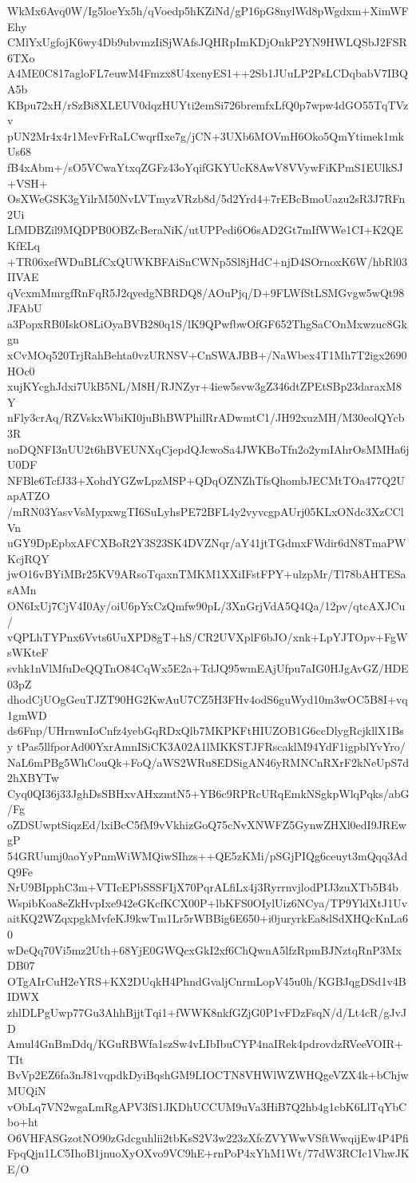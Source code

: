 WkMx6Avq0W/Ig5loeYx5h/qVoedp5hKZiNd/gP16pG8nylWd8pWgdxm+XimWFEhy
CMlYxUgfojK6wy4Db9ubvmzIiSjWAfsJQHRpImKDjOnkP2YN9HWLQSbJ2FSR6TXo
A4ME0C817agloFL7euwM4Fmzx8U4xenyES1++2Sb1JUuLP2PsLCDqbabV7IBQA5b
KBpu72xH/rSzBi8XLEUV0dqzHUYti2emSi726bremfxLfQ0p7wpw4dGO55TqTVzv
pUN2Mr4x4r1MevFrRaLCwqrfIxe7g/jCN+3UXb6MOVmH6Oko5QmYtimek1mkUs68
fB4xAbm+/sO5VCwaYtxqZGFz43oYqifGKYUcK8AwV8VVywFiKPmS1EUlkSJ+VSH+
OsXWeGSK3gYilrM50NvLVTmyzVRzb8d/5d2Yrd4+7rEBcBmoUazu2sR3J7RFn2Ui
LfMDBZil9MQDPB0OBZcBeraNiK/utUPPedi6O6sAD2Gt7mIfWWe1CI+K2QEKfELq
+TR06xefWDuBLfCxQUWKBFAiSnCWNp5Sl8jHdC+njD4SOrnoxK6W/hbRl03IIVAE
qVcxmMmrgfRnFqR5J2qyedgNBRDQ8/AOuPjq/D+9FLWfStLSMGvgw5wQt98JFAbU
a3PopxRB0IskO8LiOyaBVB280q1S/lK9QPwfbwOfGF652ThgSaCOnMxwzuc8Gkgn
xCvMOq520TrjRahBehta0vzURNSV+CnSWAJBB+/NaWbex4T1Mh7T2igx2690HOc0
xujKYcghJdxi7UkB5NL/M8H/RJNZyr+4iew5svw3gZ346dtZPEtSBp23daraxM8Y
nFly3crAq/RZVskxWbiKI0juBhBWPhilRrADwmtC1/JH92xuzMH/M30eolQYcb3R
noDQNFI3nUU2t6hBVEUNXqCjepdQJcwoSa4JWKBoTfn2o2ymIAhrOsMMHa6jU0DF
NFBle6TcfJ33+XohdYGZwLpzMSP+QDqOZNZhTfsQhombJECMtTOa477Q2UapATZO
/mRN03YasvVsMypxwgTI6SuLyhsPE72BFL4y2vyvcgpAUrj05KLxONdc3XzCClVn
uGY9DpEpbxAFCXBoR2Y3S23SK4DVZNqr/aY41jtTGdmxFWdir6dN8TmaPWKcjRQY
jwO16vBYiMBr25KV9ARsoTqaxnTMKM1XXiIFstFPY+ulzpMr/Tl78bAHTESasAMn
ON6IxUj7CjV4I0Ay/oiU6pYxCzQmfw90pL/3XnGrjVdA5Q4Qa/12pv/qtcAXJCu/
vQPLhTYPnx6Vvts6UuXPD8gT+hS/CR2UVXplF6bJO/xnk+LpYJTOpv+FgWsWKteF
svhk1nVlMfuDeQQTnO84CqWx5E2a+TdJQ95wmEAjUfpu7aIG0HJgAvGZ/HDE03pZ
dhodCjUOgGeuTJZT90HG2KwAuU7CZ5H3FHv4odS6guWyd10m3wOC5B8I+vq1gmWD
ds6Fnp/UHrnwnIoCnfz4yebGqRDxQlb7MKPKFtHIUZOB1G6ccDlygRcjkllX1Bsy
tPas5llfporAd00YxrAmnISiCK3A02A1lMKKSTJFRscaklM94YdF1igpblYvYro/
NaL6mPBg5WhCouQk+FoQ/aWS2WRu8EDSigAN46yRMNCnRXrF2kNeUpS7d2hXBYTw
Cyq0QI36j33JghDsSBHxvAHxzmtN5+YB6c9RPRcURqEmkNSgkpWlqPqks/abG/Fg
oZDSUwptSiqzEd/lxiBcC5fM9vVkhizGoQ75cNvXNWFZ5GynwZHXl0edI9JREwgP
54GRUumj0aoYyPnmWiWMQiwSIhzs++QE5zKMi/pSGjPIQg6ceuyt3mQqq3AdQ9Fe
NrU9BIpphC3m+VTIcEPbSSSFIjX70PqrALfiLx4j3RyrrnvjlodPIJ3zuXTb5B4b
WspibKoa8eZkHvpIxe942eGKcfKCX00P+lbKFS0OIylUiz6NCya/TP9YldXtJ1Uv
aitKQ2WZqxpgkMvfeKJ9kwTm1Lr5rWBBig6E650+i0juryrkEa8dSdXHQcKnLa60
wDeQq70Vi5mz2Uth+68YjE0GWQcxGkI2xf6ChQwnA5lfzRpmBJNztqRnP3MxDB07
OTgAIrCuH2eYRS+KX2DUqkH4PhndGvaljCnrmLopV45u0h/KGBJqgDSd1v4BIDWX
zhlDLPgUwp77Gu3AhhBjjtTqi1+fWWK8nkfGZjG0P1vFDzFsqN/d/Lt4cR/gJvJD
Amul4GnBmDdq/KGuRBWfa1szSw4vLIbIbuCYP4naIRek4pdrovdzRVeeVOIR+TIt
BvVp2EZ6fa3nJ81vqpdkDyiBqshGM9LIOCTN8VHWlWZWHQgeVZX4k+bChjwMUQiN
vObLq7VN2wgaLmRgAPV3fS1JKDhUCCUM9uVa3HiB7Q2hb4g1cbK6LlTqYbCbo+ht
O6VHFASGzotNO90zGdcguhlii2tbKsS2V3w223zXfcZVYWwVSftWwqijEw4P4Pfi
FpqQjn1LC5IhoB1jnuoXyOXvo9VC9hE+rnPoP4xYhM1Wt/77dW3RCIc1VhwJKE/O
